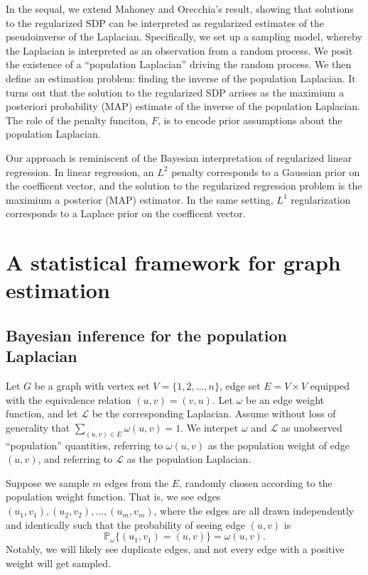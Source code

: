 \documentclass[12pt]{article}
\newcommand{\prob}{\mathbb{P}}
\theoremstyle{plain}
\begin{document}
In the sequal, we extend Mahoney and Orecchia's
result, showing that solutions to the regularized SDP can be
interpreted as regularized estimates of the pseudoinverse of the
Laplacian.  Specifically, we set up a sampling model, whereby the
Laplacian is interpreted as an observation from a random process.  We
posit the existence of a ``population Laplacian'' driving the random
process.  We then define an estimation problem: finding the inverse of
the population Laplacian.  It turns out that the solution to the
regularized SDP arrises as the maximium a posteriori probability (MAP)
estimate of the inverse of the population Laplacian.  The role of the
penalty funciton, $F$, is to encode prior assumptions about the
population Laplacian.

Our approach is reminiscent of the Bayesian interpretation of
regularized linear regression.  In linear regression, an $L^2$ penalty
corresponds to a Gaussian prior on the coefficent vector, and the
solution to the regularized regression problem is the maximium a
posterior (MAP) estimator.  In the same setting, $L^1$ regularization
corresponds to a Laplace prior on the coefficent vector.


\section{A statistical framework for graph estimation}


\subsection{Bayesian inference for the population Laplacian}

Let $G$ be a graph with vertex set $V = \{ 1, 2, \dotsc, n \}$, edge
set $E = V \times V$ equipped with the equivalence relation
$(u,v) = (v,u)$.  Let $\omega$ be an edge weight function, and let
$\mathcal{L}$ be the corresponding Laplacian.  Assume without loss of
generality that $\sum_{(u,v) \in E} \omega(u,v) = 1$.  We interpet
$\omega$ and $\mathcal{L}$ as unobserved ``population'' quantities,
referring to $\omega(u,v)$ as the population weight of edge $(u,v)$,
and referring to $\mathcal{L}$ as the population Laplacian.

Suppose we sample $m$ edges from the $E$, randomly chosen
according to the population weight function.  That is, we see edges
$(u_1, v_1), (u_2, v_2),  \dotsc, (u_m, v_m)$, where the edges are
all drawn independently and identically such that the probability of
seeing edge $(u,v)$ is
\[
  \prob_\omega\{ (u_1, v_1) = (u,v) \} = \omega(u,v).
\]
Notably, we will likely see duplicate edges, and not every edge with a
positive weight will get sampled.
\end{document}
